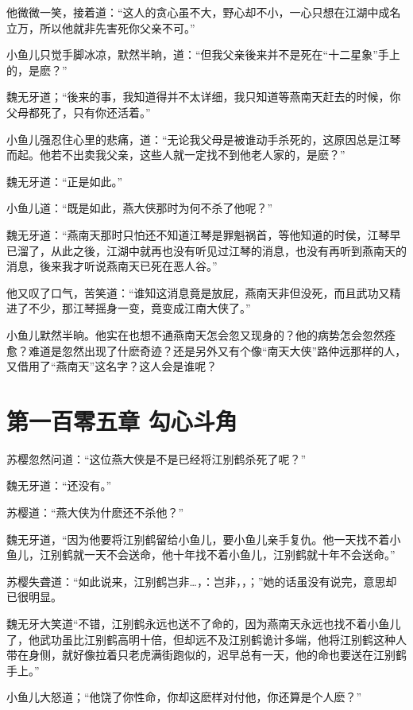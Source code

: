 \documentclass[12pt,oneside]{book}
\begin{document}
他微微一笑，接着道：``这人的贪心虽不大，野心却不小，一心只想在江湖中成名立万，所以他就非先害死你父亲不可。''

小鱼儿只觉手脚冰凉，默然半晌，道：``但我父亲後来并不是死在``十二星象''手上的，是麽？''

魏无牙道；``後来的事，我知道得并不太详细，我只知道等燕南天赶去的时候，你父母都死了，只有你还活着。''

小鱼儿强忍住心里的悲痛，道：``无论我父母是被谁动手杀死的，这原因总是江琴而起。他若不出卖我父亲，这些人就一定找不到他老人家的，是麽？''

魏无牙道：``正是如此。''

小鱼儿道：``既是如此，燕大侠那时为何不杀了他呢？''

魏无牙道：``燕南天那时只怕还不知道江琴是罪魁祸首，等他知道的时侯，江琴早已溜了，从此之後，江湖中就再也没有听见过江琴的消息，也没有再听到燕南天的消息，後来我才听说燕南天已死在恶人谷。''

他又叹了口气，苦笑道：``谁知这消息竟是放屁，燕南天非但没死，而且武功又精进了不少，那江琴摇身一变，竟变成江南大侠了。''

小鱼儿默然半晌。他实在也想不通燕南天怎会忽又现身的？他的病势怎会忽然痊愈？难道是忽然出现了什麽奇迹？还是另外又有个像``南天大侠''路仲远那样的人，又借用了``燕南天''这名字？这人会是谁呢？

\hypertarget{ux7b2cux4e00ux767eux96f6ux4e94ux7ae0-ux52feux5fc3ux6597ux89d2}{%
\chapter{第一百零五章
勾心斗角}\label{ux7b2cux4e00ux767eux96f6ux4e94ux7ae0-ux52feux5fc3ux6597ux89d2}}

苏樱忽然问道：``这位燕大侠是不是已经将江别鹤杀死了呢？''

魏无牙道：``还没有。''

苏樱道：``燕大侠为什麽还不杀他？''

魏无牙道，``因为他要将江别鹤留给小鱼儿，要小鱼儿亲手复仇。他一天找不着小鱼儿，江别鹤就一天不会送命，他十年找不着小鱼儿，江别鹤就十年不会送命。''

苏樱失聋道：``如此说来，江别鹤岂非\ldots，：岂非，，；''她的话虽没有说完，意思却已很明显。

魏无牙大笑道``不错，江别鹤永远也送不了命的，因为燕南天永远也找不着小鱼儿了，他武功虽比江别鹤高明十倍，但却远不及江别鹤诡计多端，他将江别鹤这种人带在身侧，就好像拉着只老虎满街跑似的，迟早总有一天，他的命也要送在江别鹤手上。''

小鱼儿大怒道；``他饶了你性命，你却这麽样对付他，你还算是个人麽？''
\end{document}
